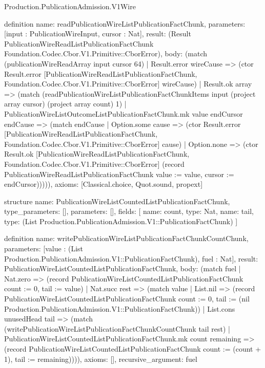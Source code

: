 \begin{lexlean}{Production.PublicationAdmission.V1Wire}
\begin{semanticmodule}
definition{
  name: readPublicationWireListPublicationFactChunk,
  parameters: [input : PublicationWireInput, cursor : Nat],
  result: (Result PublicationWireReadListPublicationFactChunk Foundation.Codec.Cbor.V1.Primitive::CborError),
  body: (match (publicationWireReadArray input cursor 64)
    | Result.error wireCause => (ctor Result.error [PublicationWireReadListPublicationFactChunk, Foundation.Codec.Cbor.V1.Primitive::CborError] wireCause)
    | Result.ok array => (match (readPublicationWireListPublicationFactChunkItems input (project array cursor) (project array count) 1)
      | PublicationWireListOutcomeListPublicationFactChunk.mk value endCursor endCause => (match endCause
        | Option.some cause => (ctor Result.error [PublicationWireReadListPublicationFactChunk, Foundation.Codec.Cbor.V1.Primitive::CborError] cause)
        | Option.none => (ctor Result.ok [PublicationWireReadListPublicationFactChunk, Foundation.Codec.Cbor.V1.Primitive::CborError] (record PublicationWireReadListPublicationFactChunk {value := value, cursor := endCursor}))))),
  axioms: [Classical.choice, Quot.sound, propext]
}

structure{
  name: PublicationWireListCountedListPublicationFactChunk,
  type_parameters: [],
  parameters: [],
  fields: [
    {name: count, type: Nat},
    {name: tail, type: (List Production.PublicationAdmission.V1::PublicationFactChunk)}
  ]
}

definition{
  name: writePublicationWireListPublicationFactChunkCountChunk,
  parameters: [value : (List Production.PublicationAdmission.V1::PublicationFactChunk), fuel : Nat],
  result: PublicationWireListCountedListPublicationFactChunk,
  body: (match fuel
    | Nat.zero => (record PublicationWireListCountedListPublicationFactChunk {count := 0, tail := value})
    | Nat.succ rest => (match value
      | List.nil => (record PublicationWireListCountedListPublicationFactChunk {count := 0, tail := (nil Production.PublicationAdmission.V1::PublicationFactChunk)})
      | List.cons unusedHead tail => (match (writePublicationWireListPublicationFactChunkCountChunk tail rest)
        | PublicationWireListCountedListPublicationFactChunk.mk count remaining => (record PublicationWireListCountedListPublicationFactChunk {count := (count + 1), tail := remaining})))),
  axioms: [],
  recursive_argument: fuel
}


\end{semanticmodule}
\end{lexlean}

